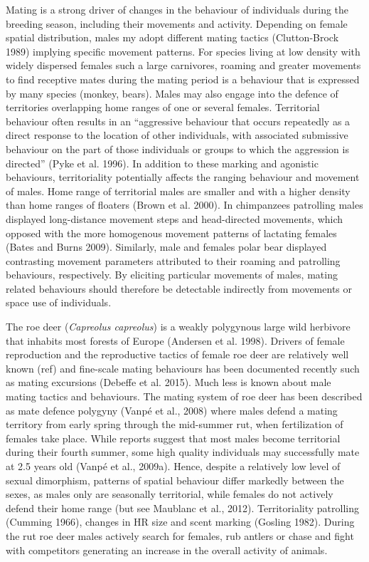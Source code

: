 \documentclass[a4paper,11pt]{article}
\begin{document}
Mating is a strong driver of changes in the behaviour of individuals
during the breeding season, including their movements and
activity. Depending on female spatial distribution, males my adopt
different mating tactics (Clutton-Brock 1989) implying specific
movement patterns. For species living at low density with widely
dispersed females such a large carnivores, roaming and greater
movements to find receptive mates during the mating period is a
behaviour that is expressed by many species (monkey, bears). Males may
also engage into the defence of territories overlapping home ranges of
one or several females. Territorial behaviour often results in an
“aggressive behaviour that occurs repeatedly as a direct response to
the location of other individuals, with associated submissive
behaviour on the part of those individuals or groups to which the
aggression is directed” (Pyke et al. 1996). In addition to these
marking and agonistic behaviours, territoriality potentially affects
the ranging behaviour and movement of males. Home range of territorial
males are smaller and with a higher density than home ranges of
floaters (Brown et al. 2000). In chimpanzees patrolling males
displayed long-distance movement steps and head-directed movements,
which opposed with the more homogenous movement patterns of lactating
females (Bates and Burns 2009). Similarly, male and females polar bear
displayed contrasting movement parameters attributed to their roaming
and patrolling behaviours, respectively. By eliciting particular
movements of males, mating related behaviours should therefore be
detectable indirectly from movements or space use of individuals.

The roe deer (\emph{Capreolus capreolus}) is a weakly polygynous large
wild herbivore that inhabits most forests of Europe (Andersen et
al. 1998). Drivers of female reproduction and the reproductive tactics
of female roe deer are relatively well known (ref) and fine-scale
mating behaviours has been documented recently such as mating
excursions (Debeffe et al. 2015). Much less is known about male mating
tactics and behaviours. The mating system of roe deer has been
described as mate defence polygyny (Vanpé et al., 2008) where males
defend a mating territory from early spring through the mid-summer
rut, when fertilization of females take place. While reports suggest
that most males become territorial during their fourth summer, some
high quality individuals may successfully mate at 2.5 years old (Vanpé
et al., 2009a). Hence, despite a relatively low level of sexual
dimorphism, patterns of spatial behaviour differ markedly between the
sexes, as males only are seasonally territorial, while females do not
actively defend their home range (but see Maublanc et al.,
2012). Territoriality patrolling (Cumming 1966), changes in HR size
and scent marking (Gosling 1982). During the rut roe deer males
actively search for females, rub antlers or chase and fight with
competitors generating an increase in the overall activity of animals.
\end{document}
